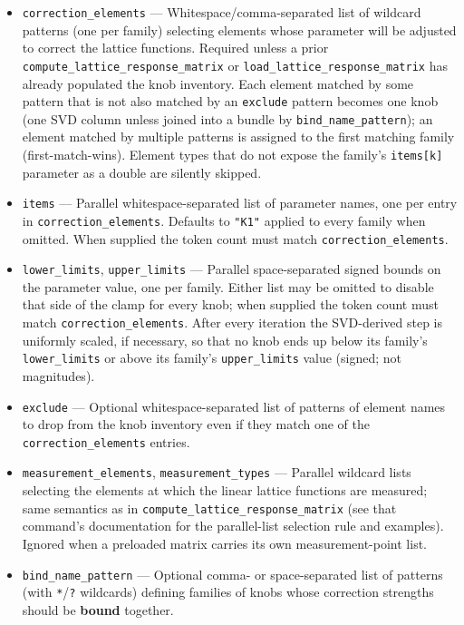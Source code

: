\documentclass[11pt]{article}
\begin{document}
\begin{itemize}
\item \verb|correction_elements| --- Whitespace/comma-separated list of
  wildcard patterns (one per family) selecting elements whose parameter will
  be adjusted to correct the lattice functions.  Required unless a prior
  \verb|compute_lattice_response_matrix| or \verb|load_lattice_response_matrix|
  has already populated the knob inventory.  Each element matched by some
  pattern that is not also matched by an \verb|exclude| pattern becomes one
  knob (one SVD column unless joined into a bundle by \verb|bind_name_pattern|);
  an element matched by multiple patterns is assigned to the first matching
  family (first-match-wins).  Element types that do not expose the family's
  \verb|items[k]| parameter as a double are silently skipped.
\item \verb|items| --- Parallel whitespace-separated list of parameter names,
  one per entry in \verb|correction_elements|.  Defaults to \verb|"K1"|
  applied to every family when omitted.  When supplied the token count must
  match \verb|correction_elements|.
\item \verb|lower_limits|, \verb|upper_limits| --- Parallel space-separated
  signed bounds on the parameter value, one per family.  Either list may be
  omitted to disable that side of the clamp for every knob; when supplied
  the token count must match \verb|correction_elements|.  After every
  iteration the SVD-derived step is uniformly scaled, if necessary, so that
  no knob ends up below its family's \verb|lower_limits| or above its family's
  \verb|upper_limits| value (signed; not magnitudes).
\item \verb|exclude| --- Optional whitespace-separated list of patterns of
  element names to drop from the knob inventory even if they match one of
  the \verb|correction_elements| entries.
\item \verb|measurement_elements|, \verb|measurement_types| --- Parallel
  wildcard lists selecting the elements at which the linear lattice
  functions are measured; same semantics as in
  \verb|compute_lattice_response_matrix| (see that command's
  documentation for the parallel-list selection rule and examples).
  Ignored when a preloaded matrix carries its own measurement-point
  list.
\item \verb|bind_name_pattern| --- Optional comma- or space-separated
  list of patterns (with \verb|*|/\verb|?| wildcards) defining families
  of knobs whose correction strengths should be {\bf bound} together.

\end{itemize}
\end{document}
